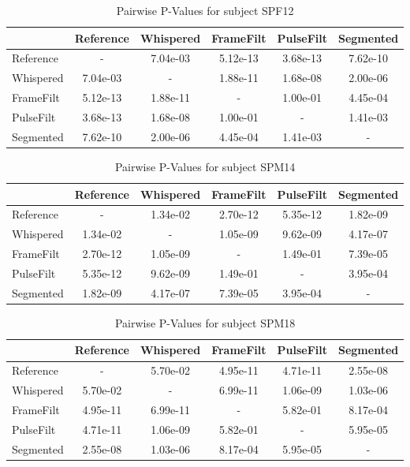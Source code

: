 \begin{table}[H]
    \centering
    \begin{tabular}{lccccc}
        \hline
        & Reference & Whispered & FrameFilt & PulseFilt & Segmented \\
        \hline
        Reference & - & 7.04e-03 & 5.12e-13 & 3.68e-13 & 7.62e-10 \\
        Whispered & 7.04e-03 & - & 1.88e-11 & 1.68e-08 & 2.00e-06 \\
        FrameFilt & 5.12e-13 & 1.88e-11 & - & 1.00e-01 & 4.45e-04 \\
        PulseFilt & 3.68e-13 & 1.68e-08 & 1.00e-01 & - & 1.41e-03 \\
        Segmented & 7.62e-10 & 2.00e-06 & 4.45e-04 & 1.41e-03 & - \\
        \hline
    \end{tabular}
    \caption{Pairwise P-Values for subject SPF12}
    \label{tab:pairwiseSPF12}
\end{table}

\begin{table}[H]
    \centering
    \begin{tabular}{lccccc}
        \hline
        & Reference & Whispered & FrameFilt & PulseFilt & Segmented \\
        \hline
        Reference & - & 1.34e-02 & 2.70e-12 & 5.35e-12 & 1.82e-09 \\
        Whispered & 1.34e-02 & - & 1.05e-09 & 9.62e-09 & 4.17e-07 \\
        FrameFilt & 2.70e-12 & 1.05e-09 & - & 1.49e-01 & 7.39e-05 \\
        PulseFilt & 5.35e-12 & 9.62e-09 & 1.49e-01 & - & 3.95e-04 \\
        Segmented & 1.82e-09 & 4.17e-07 & 7.39e-05 & 3.95e-04 & - \\
        \hline
    \end{tabular}
    \caption{Pairwise P-Values for subject SPM14}
    \label{tab:pairwiseSPM14}
\end{table}

\begin{table}[H]
    \centering
    \begin{tabular}{lccccc}
        \hline
        & Reference & Whispered & FrameFilt & PulseFilt & Segmented \\
        \hline
        Reference & - & 5.70e-02 & 4.95e-11 & 4.71e-11 & 2.55e-08 \\
        Whispered & 5.70e-02 & - & 6.99e-11 & 1.06e-09 & 1.03e-06 \\
        FrameFilt & 4.95e-11 & 6.99e-11 & - & 5.82e-01 & 8.17e-04 \\
        PulseFilt & 4.71e-11 & 1.06e-09 & 5.82e-01 & - & 5.95e-05 \\
        Segmented & 2.55e-08 & 1.03e-06 & 8.17e-04 & 5.95e-05 & - \\
        \hline
    \end{tabular}
    \caption{Pairwise P-Values for subject SPM18}
    \label{tab:pairwiseSPM18}
\end{table}